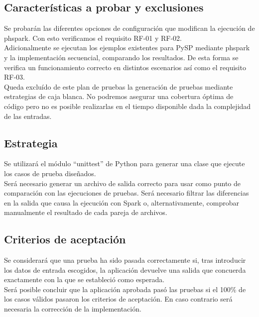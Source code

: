 \subsection{Características a probar y exclusiones}

Se probarán las diferentes opciones de configuración que modifican la ejecución de phspark. Con esto verificamos el requisito RF-01 y RF-02.\\

Adicionalmente se ejecutan los ejemplos existentes para PySP mediante phspark y la implementación secuencial, comparando los resultados. De esta forma se verifica un funcionamiento correcto en distintos escenarios así como el requisito RF-03.\\

Queda excluído de este plan de pruebas la generación de pruebas mediante estrategias de caja blanca. No podremos asegurar una cobertura óptima de código pero no es posible realizarlas en el tiempo disponible dada la complejidad de las entradas.

\subsection{Estrategia}

Se utilizará el módulo ``unittest'' de Python para generar una clase que ejecute los casos de prueba diseñados.\\

Será necesario generar un archivo de salida correcto para usar como punto de comparación con las ejecuciones de pruebas. Será necesario filtrar las diferencias en la salida que causa la ejecución con Spark o, alternativamente, comprobar manualmente el resultado de cada pareja de archivos.

\subsection{Criterios de aceptación}

Se considerará que una prueba ha sido pasada correctamente si, tras introducir los datos de entrada escogidos, la aplicación devuelve una salida que concuerda exactamente con la que se estableció como esperada.\\

Será posible concluir que la aplicación aprobada pasó las pruebas si el 100\% de los casos válidos pasaron los criterios de aceptación. En caso contrario será necesaria la corrección de la implementación.

